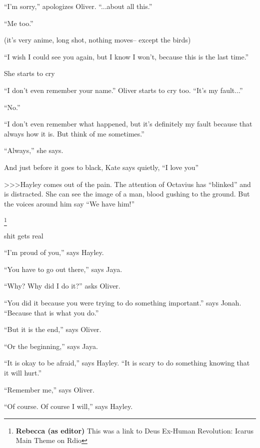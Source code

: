 ``I'm sorry,'' apologizes Oliver.  ``...about all this.''

``Me too.''

(it's very anime, long shot, nothing moves-- except the birds)

``I wish I could see you again, but I know I won't, because this is the last time.''

She starts to cry

``I don't even remember your name.'' Oliver starts to cry too.  ``It's my fault...''

``No.''

``I don't even remember what happened, but it's definitely my fault because that always how it is.  But think of me sometimes.''

``Always,'' she says.



And just before it goes to black, Kate says quietly, ``I love you''



\textgreater \textgreater \textgreater  Hayley comes out of the pain.  The attention of Octavius has ``blinked'' and is distracted.  She can see the image of a man, blood gushing to the ground.  But the voices around him say ``We have him!''



 \footnote{\textbf{Rebecca (as editor) }This was a link to Deus Ex-Human Revolution: Icarus Main Theme on Rdio}

shit gets real



``I'm proud of you,'' says Hayley.



``You have to go out there,'' says Jaya.

``Why?  Why did I do it?'' asks Oliver.

``You did it because you were trying to do something important.'' says Jonah.  ``Because that is what you do.''

``But it is the end,'' says Oliver.

``Or the beginning,'' says Jaya.



``It is okay to be afraid,'' says Hayley.  ``It is scary to do something knowing that it will hurt.''



``Remember me,'' says Oliver.

``Of course.  Of course I will,'' says Hayley.

